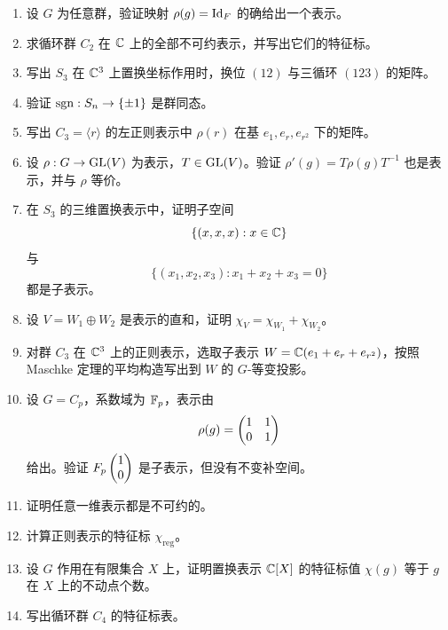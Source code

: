 \begin{enumerate}[label={\textbf{习题8.\arabic*.}}, wide=0pt, leftmargin=3.2em]
\item \basic 设 $G$ 为任意群，验证映射 $\rho(g)=\mathrm{Id}_F$ 的确给出一个表示。

\item \basic 求循环群 $C_2$ 在 $\mathbb{C}$ 上的全部不可约表示，并写出它们的特征标。

\item \basic 写出 $S_3$ 在 $\mathbb{C}^3$ 上置换坐标作用时，换位 $(12)$ 与三循环 $(123)$ 的矩阵。

\item \basic 验证 $\operatorname{sgn}:S_n\to \{\pm 1\}$ 是群同态。

\item \basic 写出 $C_3=\langle r\rangle$ 的左正则表示中 $\rho(r)$ 在基 $e_1,e_r,e_{r^2}$ 下的矩阵。

\item \basic 设 $\rho:G\to \mathrm{GL}(V)$ 为表示，$T\in \mathrm{GL}(V)$。验证 $\rho'(g)=T\rho(g)T^{-1}$ 也是表示，并与 $\rho$ 等价。

\item \basic 在 $S_3$ 的三维置换表示中，证明子空间
\[
\{(x,x,x):x\in \mathbb{C}\}
\]
与
\[
\{(x_1,x_2,x_3):x_1+x_2+x_3=0\}
\]
都是子表示。

\item \basic 设 $V=W_1\oplus W_2$ 是表示的直和，证明 $\chi_V=\chi_{W_1}+\chi_{W_2}$。

\item \basic 对群 $C_3$ 在 $\mathbb{C}^3$ 上的正则表示，选取子表示 $W=\mathbb{C}(e_1+e_r+e_{r^2})$，按照 Maschke 定理的平均构造写出到 $W$ 的 $G$-等变投影。

\item \basic 设 $G=C_p$，系数域为 $\mathbb{F}_p$，表示由
\[
\rho(g)=\begin{pmatrix} 1&1\\0&1 \end{pmatrix}
\]
给出。验证 $F_p\begin{pmatrix} 1\\0 \end{pmatrix}$ 是子表示，但没有不变补空间。

\item \basic 证明任意一维表示都是不可约的。

\item \basic 计算正则表示的特征标 $\chi_{\mathrm{reg}}$。

\item \basic 设 $G$ 作用在有限集合 $X$ 上，证明置换表示 $\mathbb{C}[X]$ 的特征标值 $\chi(g)$ 等于 $g$ 在 $X$ 上的不动点个数。

\item \basic 写出循环群 $C_4$ 的特征标表。


\end{enumerate}
